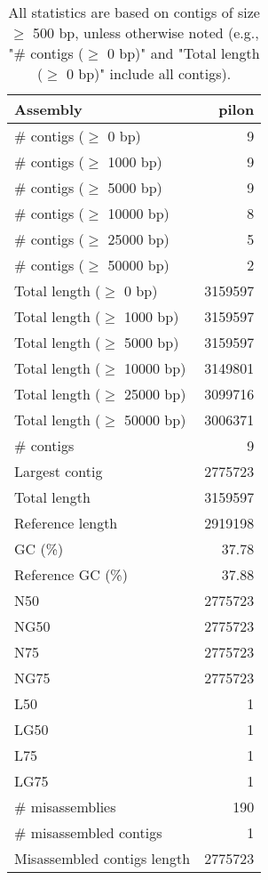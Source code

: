 \documentclass[12pt,a4paper]{article}
\begin{document}
\begin{table}[ht]
\begin{center}
\caption{All statistics are based on contigs of size $\geq$ 500 bp, unless otherwise noted (e.g., "\# contigs ($\geq$ 0 bp)" and "Total length ($\geq$ 0 bp)" include all contigs).}
\begin{tabular}{|l*{1}{|r}|}
\hline
Assembly & pilon \\ \hline
\# contigs ($\geq$ 0 bp) & 9 \\ \hline
\# contigs ($\geq$ 1000 bp) & 9 \\ \hline
\# contigs ($\geq$ 5000 bp) & 9 \\ \hline
\# contigs ($\geq$ 10000 bp) & 8 \\ \hline
\# contigs ($\geq$ 25000 bp) & 5 \\ \hline
\# contigs ($\geq$ 50000 bp) & 2 \\ \hline
Total length ($\geq$ 0 bp) & 3159597 \\ \hline
Total length ($\geq$ 1000 bp) & 3159597 \\ \hline
Total length ($\geq$ 5000 bp) & 3159597 \\ \hline
Total length ($\geq$ 10000 bp) & 3149801 \\ \hline
Total length ($\geq$ 25000 bp) & 3099716 \\ \hline
Total length ($\geq$ 50000 bp) & 3006371 \\ \hline
\# contigs & 9 \\ \hline
Largest contig & 2775723 \\ \hline
Total length & 3159597 \\ \hline
Reference length & 2919198 \\ \hline
GC (\%) & 37.78 \\ \hline
Reference GC (\%) & 37.88 \\ \hline
N50 & 2775723 \\ \hline
NG50 & 2775723 \\ \hline
N75 & 2775723 \\ \hline
NG75 & 2775723 \\ \hline
L50 & 1 \\ \hline
LG50 & 1 \\ \hline
L75 & 1 \\ \hline
LG75 & 1 \\ \hline
\# misassemblies & 190 \\ \hline
\# misassembled contigs & 1 \\ \hline
Misassembled contigs length & 2775723 \\ \hline

\end{tabular}
\end{center}
\end{table}
\end{document}
